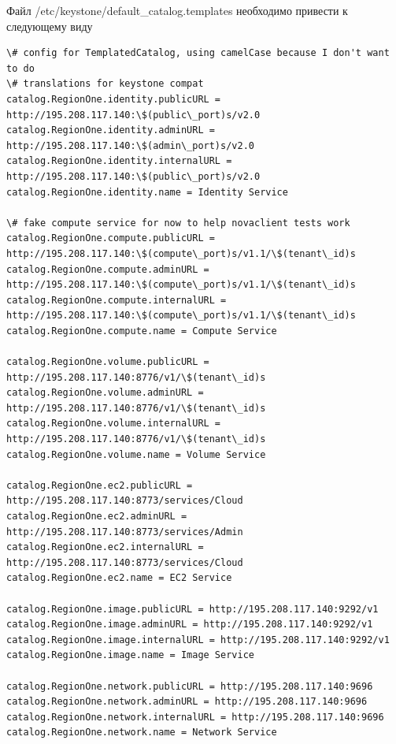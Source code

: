 \documentclass[letterpaper,10pt,russian]{sphinxmanual}
\begin{document}

Файл /etc/keystone/default\_catalog.templates необходимо привести к следующему виду

\begin{Verbatim}[commandchars=\\\{\}]
\# config for TemplatedCatalog, using camelCase because I don't want to do
\# translations for keystone compat
catalog.RegionOne.identity.publicURL = http://195.208.117.140:\$(public\_port)s/v2.0
catalog.RegionOne.identity.adminURL = http://195.208.117.140:\$(admin\_port)s/v2.0
catalog.RegionOne.identity.internalURL = http://195.208.117.140:\$(public\_port)s/v2.0
catalog.RegionOne.identity.name = Identity Service

\# fake compute service for now to help novaclient tests work
catalog.RegionOne.compute.publicURL = http://195.208.117.140:\$(compute\_port)s/v1.1/\$(tenant\_id)s
catalog.RegionOne.compute.adminURL = http://195.208.117.140:\$(compute\_port)s/v1.1/\$(tenant\_id)s
catalog.RegionOne.compute.internalURL = http://195.208.117.140:\$(compute\_port)s/v1.1/\$(tenant\_id)s
catalog.RegionOne.compute.name = Compute Service

catalog.RegionOne.volume.publicURL = http://195.208.117.140:8776/v1/\$(tenant\_id)s
catalog.RegionOne.volume.adminURL = http://195.208.117.140:8776/v1/\$(tenant\_id)s
catalog.RegionOne.volume.internalURL = http://195.208.117.140:8776/v1/\$(tenant\_id)s
catalog.RegionOne.volume.name = Volume Service

catalog.RegionOne.ec2.publicURL = http://195.208.117.140:8773/services/Cloud
catalog.RegionOne.ec2.adminURL = http://195.208.117.140:8773/services/Admin
catalog.RegionOne.ec2.internalURL = http://195.208.117.140:8773/services/Cloud
catalog.RegionOne.ec2.name = EC2 Service

catalog.RegionOne.image.publicURL = http://195.208.117.140:9292/v1
catalog.RegionOne.image.adminURL = http://195.208.117.140:9292/v1
catalog.RegionOne.image.internalURL = http://195.208.117.140:9292/v1
catalog.RegionOne.image.name = Image Service

catalog.RegionOne.network.publicURL = http://195.208.117.140:9696
catalog.RegionOne.network.adminURL = http://195.208.117.140:9696
catalog.RegionOne.network.internalURL = http://195.208.117.140:9696
catalog.RegionOne.network.name = Network Service
\end{Verbatim}
\end{document}
